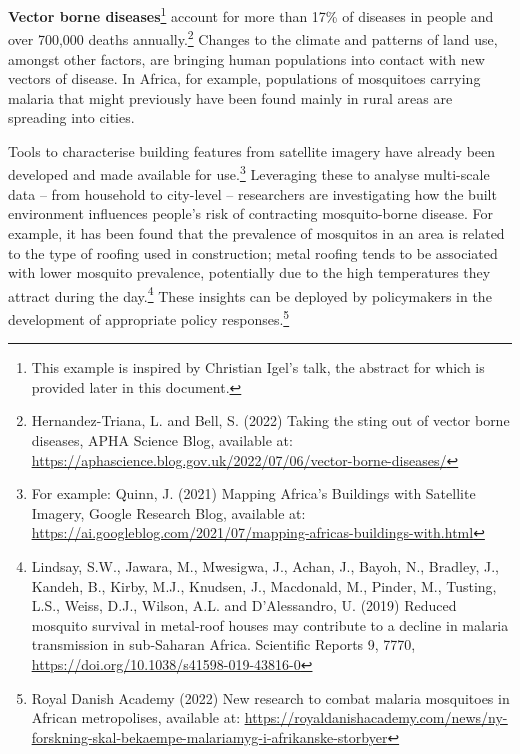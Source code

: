 {\textbf{Vector borne diseases}\footnote{This example is inspired by
  Christian Igel's talk, the abstract for which is provided later in
  this document.} account for more than 17\% of diseases in people and
over 700,000 deaths annually.\footnote{Hernandez-Triana, L. and Bell, S.
  (2022) Taking the sting out of vector borne diseases, APHA Science
  Blog, available at:
  \href{https://aphascience.blog.gov.uk/2022/07/06/vector-borne-diseases/}{\uline{https://aphascience.blog.gov.uk/2022/07/06/vector-borne-diseases/}}}
Changes to the climate and patterns of land use, amongst other factors,
are bringing human populations into contact with new vectors of disease.
In Africa, for example, populations of mosquitoes carrying malaria that
might previously have been found mainly in rural areas are spreading
into cities.

Tools to characterise building features from satellite imagery have
already been developed and made available for use.\footnote{For example:
  Quinn, J. (2021) Mapping Africa's Buildings with Satellite Imagery,
  Google Research Blog, available at:
  \href{https://ai.googleblog.com/2021/07/mapping-africas-buildings-with.html}{\uline{https://ai.googleblog.com/2021/07/mapping-africas-buildings-with.html}}}
Leveraging these to analyse multi-scale data -- from household to
city-level -- researchers are investigating how the built environment
influences people's risk of contracting mosquito-borne disease. For
example, it has been found that the prevalence of mosquitos in an area
is related to the type of roofing used in construction; metal roofing
tends to be associated with lower mosquito prevalence, potentially due
to the high temperatures they attract during the day.\footnote{Lindsay,
  S.W., Jawara, M., Mwesigwa, J., Achan, J., Bayoh, N., Bradley, J.,
  Kandeh, B., Kirby, M.J., Knudsen, J., Macdonald, M., Pinder, M.,
  Tusting, L.S., Weiss, D.J., Wilson, A.L. and D'Alessandro, U. (2019)
  Reduced mosquito survival in metal-roof houses may contribute to a
  decline in malaria transmission in sub-Saharan Africa. Scientific
  Reports 9, 7770,
  \href{https://doi.org/10.1038/s41598-019-43816-0}{\uline{https://doi.org/10.1038/s41598-019-43816-0}}}
These insights can be deployed by policymakers in the development of
appropriate policy responses.\footnote{Royal Danish Academy (2022) New
  research to combat malaria mosquitoes in African metropolises,
  available at:
  \href{https://royaldanishacademy.com/news/ny-forskning-skal-bekaempe-malariamyg-i-afrikanske-storbyer}{\uline{https://royaldanishacademy.com/news/ny-forskning-skal-bekaempe-malariamyg-i-afrikanske-storbyer}}}

}
